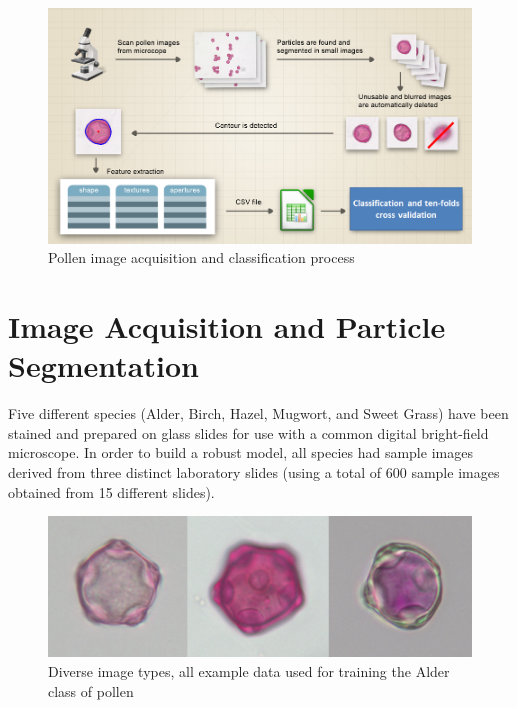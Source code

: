\documentclass[runningheads,a4paper]{llncs}
\begin{document}
    
    
    
    
    
  
  
  
  
  
  
  
  
  
  
  
  
  
  
  
  
  

\begin{figure}[h!]
\begin{center}
\includegraphics[width=1\columnwidth]{figures/Process1/Process1.png}
\caption{\label{fig:process}
Pollen image acquisition and classification process%
}
\end{center}
\end{figure}

\section{Image Acquisition and Particle Segmentation}

Five different species (Alder, Birch, Hazel, Mugwort, and Sweet Grass) have been stained and prepared on glass slides for use with a common digital bright-field microscope. In order to build a robust model, all species had sample images derived from three distinct laboratory slides (using a total of 600 sample images obtained from 15 different slides).
  
  
  
  
  
  
  

\begin{figure}[h!]
\begin{center}
\includegraphics[width=0.7\columnwidth]{figures/3example/3example.png}
\caption{\label{fig:trainingImages}
Diverse image types, all example data used for training the Alder class of pollen}
\end{center}
\end{figure}
\end{document}
